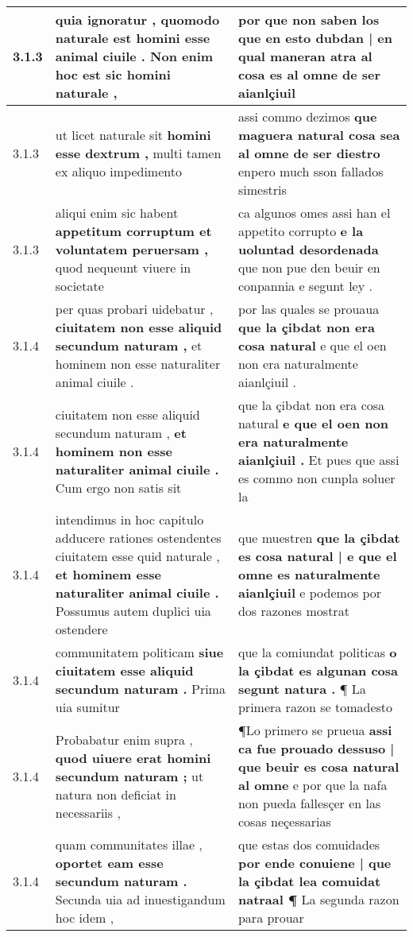 \begin{tabular}{|p{1cm}|p{6.5cm}|p{6.5cm}|}
3.1.3 & quia ignoratur , \textbf{ quomodo naturale est homini esse animal ciuile . } Non enim hoc est sic homini naturale , & por que non saben los \textbf{ que en esto dubdan | en qual maneran atra al cosa es al omne de ser } aianlçiuil \\\hline
3.1.3 & ut licet naturale sit \textbf{ homini esse dextrum , } multi tamen ex aliquo impedimento & assi commo dezimos \textbf{ que maguera natural cosa sea al omne de ser diestro } enpero much sson fallados simestris \\\hline
3.1.3 & aliqui enim sic habent \textbf{ appetitum corruptum et voluntatem peruersam , } quod nequeunt viuere in societate & ca algunos omes assi han el appetito corrupto \textbf{ e la uoluntad desordenada } que non pue den beuir en conpannia e segunt ley . \\\hline
3.1.4 & per quas probari uidebatur , \textbf{ ciuitatem non esse aliquid secundum naturam , } et hominem non esse naturaliter animal ciuile . & por las quales se prouaua \textbf{ que la çibdat non era cosa natural } e que el oen non era naturalmente aianlçiuil . \\\hline
3.1.4 & ciuitatem non esse aliquid secundum naturam , \textbf{ et hominem non esse naturaliter animal ciuile . } Cum ergo non satis sit & que la çibdat non era cosa natural \textbf{ e que el oen non era naturalmente aianlçiuil . } Et pues que assi es commo non cunpla soluer la \\\hline
3.1.4 & intendimus in hoc capitulo adducere rationes ostendentes ciuitatem esse quid naturale , \textbf{ et hominem esse naturaliter animal ciuile . } Possumus autem duplici uia ostendere & que muestren \textbf{ que la çibdat es cosa natural | e que el omne es naturalmente aianlçiuil } e podemos por dos razones mostrat \\\hline
3.1.4 & communitatem politicam \textbf{ siue ciuitatem esse aliquid secundum naturam . } Prima uia sumitur & que la comiundat politicas \textbf{ o la çibdat es algunan cosa segunt natura . } ¶ La primera razon se tomadesto \\\hline
3.1.4 & Probabatur enim supra , \textbf{ quod uiuere erat homini secundum naturam ; } ut natura non deficiat in necessariis , & ¶Lo primero se prueua \textbf{ assi ca fue prouado dessuso | que beuir es cosa natural al omne } e por que la nafa non pueda fallesçer en las cosas neçessarias \\\hline
3.1.4 & quam communitates illae , \textbf{ oportet eam esse secundum naturam . } Secunda uia ad inuestigandum hoc idem , & que estas dos comuidades \textbf{ por ende conuiene | que la çibdat lea comuidat natraal ¶ } La segunda razon para prouar \\\hline

\end{tabular}
